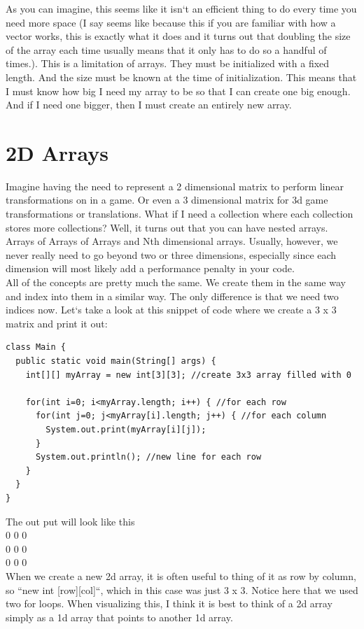 \documentclass[11]{article}
\begin{document}
As you can imagine, this seems like it isn`t an efficient thing to do every time you need more space (I say seems like because this if you are familiar with how a vector works, this is exactly what it does and it turns out that doubling the size of the array each time usually means that it only has to do so a handful of times.). This is a limitation of arrays. They must be initialized with a fixed length. And the size must be known at the time of initialization. This means that I must know how big I need my array to be so that I can create one big enough. And if I need one bigger, then I must create an entirely new array.

\section{2D Arrays}
Imagine having the need to represent a 2 dimensional matrix to perform linear transformations on in a game. Or even a 3 dimensional matrix for 3d game transformations or translations. What if I need a collection where each collection stores more collections? Well, it turns out that you can have nested arrays. Arrays of Arrays of Arrays and Nth dimensional arrays. Usually, however, we never really need to go beyond two or three dimensions, especially since each dimension will most likely add a performance penalty in your code.\\

All of the concepts are pretty much the same. We create them in the same way and index into them in a similar way. The only difference is that we need two indices now. Let`s take a look at this snippet of code where we create a $3$ x $3$ matrix and print it out:

\begin{lstlisting}
class Main {
  public static void main(String[] args) {
    int[][] myArray = new int[3][3]; //create 3x3 array filled with 0

    for(int i=0; i<myArray.length; i++) { //for each row
      for(int j=0; j<myArray[i].length; j++) { //for each column
        System.out.print(myArray[i][j]);
      }
      System.out.println(); //new line for each row
    } 
  }
}
\end{lstlisting}

The out put will look like this\\
0 0 0\\0 0 0\\ 0 0 0\\

When we create a new 2d array, it is often useful to thing of it as row by column, so ``new int [row][col]``, which in this case was just 3 x 3. Notice here that we used two for loops. When visualizing this, I think it is best to think of a 2d array simply as a 1d array that points to another 1d array.
\end{document}
